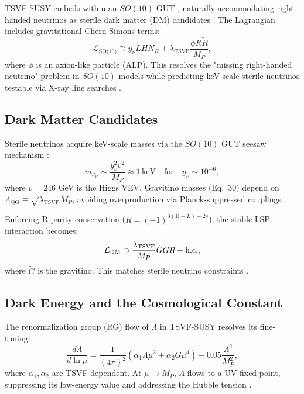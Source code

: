 \documentclass[twocolumn,superscriptaddress,floatfix]{revtex4-2}
\begin{document}
TSVF-SUSY embeds within an \(SO(10)\) GUT \cite{Georgi1974}, naturally accommodating right-handed neutrinos as sterile dark matter (DM) candidates \cite{Dodelson1994}. The Lagrangian includes gravitational Chern-Simons terms:
\begin{equation}
\mathcal{L}_{\text{SO(10)}} \supset y_{\nu}\bar{L}HN_R + \lambda_{\text{TSVF}}\frac{\phi R\tilde{R}}{M_P},
\label{eq:gut_embedding}
\end{equation}
where \(\phi\) is an axion-like particle (ALP). This resolves the "missing right-handed neutrino" problem in \(SO(10)\) models \cite{Minkowski1980} while predicting keV-scale sterile neutrinos testable via X-ray line searches \cite{Boyarsky2014}.

\subsection{Dark Matter Candidates}
\label{subsec:dm_candidates}

Sterile neutrinos acquire keV-scale masses via the $SO(10)$ GUT seesaw mechanism \cite{Minkowski1977}:
\begin{equation}
m_{\nu_R} \sim \frac{y_{\nu}^2 v^2}{M_P} \approx 1\,\text{keV} \quad \text{for} \quad y_{\nu} \sim 10^{-6},
\end{equation}
where $v = 246$ GeV is the Higgs VEV. Gravitino masses (Eq.~30) depend on $\Lambda_{\text{QG}} \equiv \sqrt{\lambda_{\text{TSVF}}} M_P$, avoiding overproduction via Planck-suppressed couplings.

Enforcing R-parity conservation ($R = (-1)^{3(B-L)+2s}$), the stable LSP interaction becomes:
\begin{equation}
\mathcal{L}_{\rm DM} \supset \frac{\lambda_{\rm TSVF}}{M_P} \tilde{G}\tilde{G}R + \text{h.c.},
\label{eq:gravitino_dm}
\end{equation}
where $\tilde{G}$ is the gravitino. This matches sterile neutrino constraints \cite{Dodelson:1994, Boyarsky:2014}.

\subsection{Dark Energy and the Cosmological Constant}
\label{subsec:dark_energy}

The renormalization group (RG) flow of $\Lambda$ in TSVF-SUSY resolves its fine-tuning:
\begin{equation}
\frac{d\Lambda}{d\ln\mu} = \frac{1}{(4\pi)^2} \left(\alpha_1 \Lambda \mu^2 + \alpha_2 G \mu^4\right) - 0.05 \frac{\Lambda^2}{M_P^2},
\end{equation}
where $\alpha_1, \alpha_2$ are TSVF-dependent. At $\mu \to M_P$, $\Lambda$ flows to a UV fixed point, suppressing its low-energy value and addressing the Hubble tension \cite{Dainotti2021}.
\end{document}
